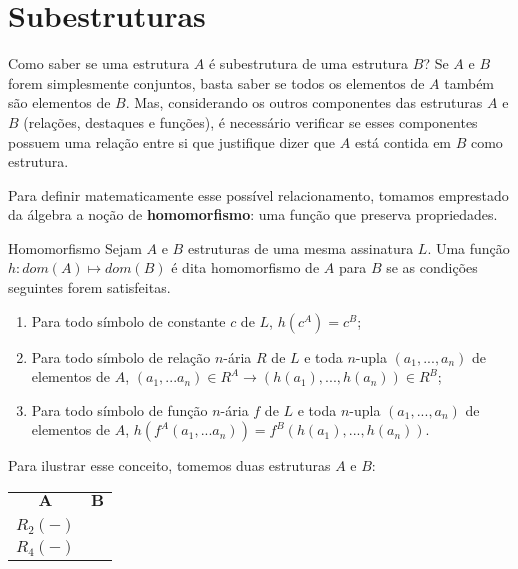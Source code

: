 \section{Subestruturas}

Como saber se uma estrutura $A$ é subestrutura de uma estrutura $B$? Se $A$ e $B$ forem simplesmente conjuntos, basta saber se todos os elementos de $A$ também são elementos de $B$. Mas, considerando os outros componentes das estruturas $A$ e $B$ (relações, destaques e funções), é necessário verificar se esses componentes possuem uma relação entre si que justifique dizer que $A$ está contida em $B$ como estrutura.

Para definir matematicamente esse possível relacionamento, tomamos emprestado da álgebra a noção de \textbf{homomorfismo}: uma função que preserva propriedades.

\begin{definition}{Homomorfismo}
    Sejam $A$ e $B$ estruturas de uma mesma assinatura $L$. Uma função $h: dom(A) \mapsto dom(B)$ é dita homomorfismo de $A$ para $B$ se as condições seguintes forem satisfeitas.
    \begin{enumerate}
        \item Para todo símbolo de constante $c$ de $L$, $h(c^A) = c^B$;
        \item Para todo símbolo de relação $n$-ária $R$ de $L$ e toda $n$-upla $(a_1,...,a_n)$ de elementos de $A$, $(a_1,...a_n) \in R^A \rightarrow (h(a_1),...,h(a_n)) \in R^B$;
        \item Para todo símbolo de função $n$-ária $f$ de $L$ e toda $n$-upla $(a_1,...,a_n)$ de elementos de $A$, $h(f^A(a_1,...a_n)) = f^B(h(a_1),...,h(a_n))$.  
    \end{enumerate}
\end{definition}

Para ilustrar esse conceito, tomemos duas estruturas $A$ e $B$:

\begin{table}[h]
    \centering
    \begin{tabular}{c c}
        $\mathbf{A}$ & $\mathbf{B}$ \\
        \begin{structure}
            {}
            {$0$ $1$ $3$ $5$}
            {$R_1(-,-)$\\$R_2(-)$}
            {$1$ $3$}
            {$f(-)$}
        \end{structure}
        &
        \begin{structure}
            {}
            {$0$ $1$ $2$ $3$ $5$}
            {$R_3(-,-)$\\$R_4(-)$}
            {$1$ $2$}
            {$g(-)$}
        \end{structure} 
    \end{tabular}
\end{table}

